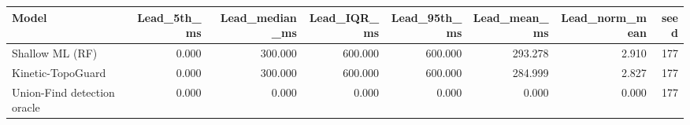 \begin{tabular}{lrrrrrrr}
\toprule
Model & Lead\_5th\_ms & Lead\_median\_ms & Lead\_IQR\_ms & Lead\_95th\_ms & Lead\_mean\_ms & Lead\_norm\_mean & seed \\
\midrule
Shallow ML (RF) & 0.000 & 300.000 & 600.000 & 600.000 & 293.278 & 2.910 & 177 \\
Kinetic-TopoGuard & 0.000 & 300.000 & 600.000 & 600.000 & 284.999 & 2.827 & 177 \\
Union-Find detection oracle & 0.000 & 0.000 & 0.000 & 0.000 & 0.000 & 0.000 & 177 \\
\bottomrule
\end{tabular}